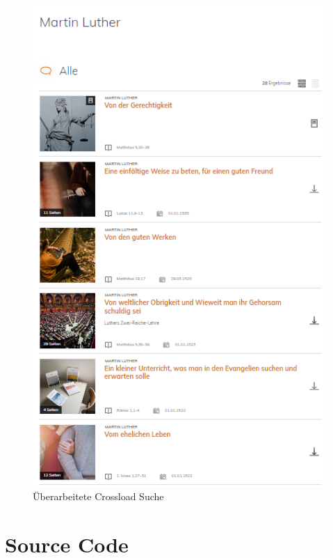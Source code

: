\begin{figure}[ht!]
  \begin{centering}
    \includegraphics[width=.8\textwidth]{figures/appendix/crossloadSucheNeu.png}
    \caption{Überarbeitete Crossload Suche \cite{pfleiderer2022}}
    \label{fig:crossloadSucheNeu}
  \end{centering}
\end{figure}

\clearpage
\section{Source Code}
\label{annex:sourceCode}

